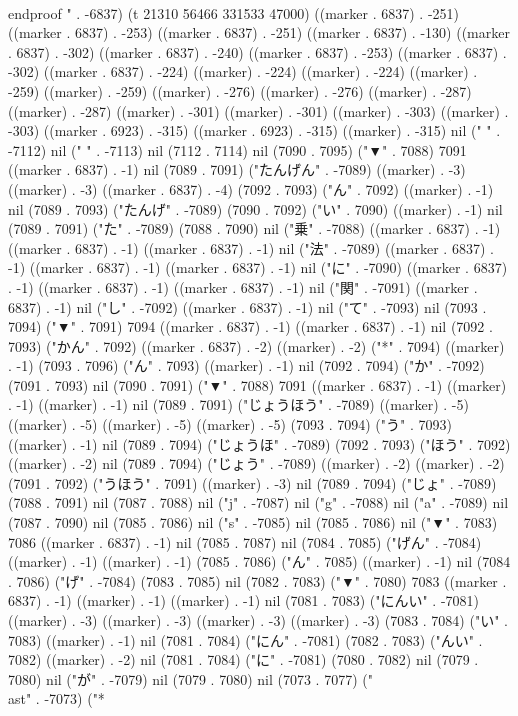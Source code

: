 \\end{proof}
" . -6837) (t 21310 56466 331533 47000) ((marker . 6837) . -251) ((marker . 6837) . -253) ((marker . 6837) . -251) ((marker . 6837) . -130) ((marker . 6837) . -302) ((marker . 6837) . -240) ((marker . 6837) . -253) ((marker . 6837) . -302) ((marker . 6837) . -224) ((marker) . -224) ((marker) . -224) ((marker) . -259) ((marker) . -259) ((marker) . -276) ((marker) . -276) ((marker) . -287) ((marker) . -287) ((marker) . -301) ((marker) . -301) ((marker) . -303) ((marker) . -303) ((marker . 6923) . -315) ((marker . 6923) . -315) ((marker) . -315) nil ("
" . -7112) nil (" " . -7113) nil (7112 . 7114) nil (7090 . 7095) ("▼" . 7088) 7091 ((marker . 6837) . -1) nil (7089 . 7091) ("たんげん" . -7089) ((marker) . -3) ((marker) . -3) ((marker . 6837) . -4) (7092 . 7093) ("ん" . 7092) ((marker) . -1) nil (7089 . 7093) ("たんげ" . -7089) (7090 . 7092) ("い" . 7090) ((marker) . -1) nil (7089 . 7091) ("た" . -7089) (7088 . 7090) nil ("乗" . -7088) ((marker . 6837) . -1) ((marker . 6837) . -1) ((marker . 6837) . -1) nil ("法" . -7089) ((marker . 6837) . -1) ((marker . 6837) . -1) ((marker . 6837) . -1) nil ("に" . -7090) ((marker . 6837) . -1) ((marker . 6837) . -1) ((marker . 6837) . -1) nil ("関" . -7091) ((marker . 6837) . -1) nil ("し" . -7092) ((marker . 6837) . -1) nil ("て" . -7093) nil (7093 . 7094) ("▼" . 7091) 7094 ((marker . 6837) . -1) ((marker . 6837) . -1) nil (7092 . 7093) ("かん" . 7092) ((marker . 6837) . -2) ((marker) . -2) ("*" . 7094) ((marker) . -1) (7093 . 7096) ("ん" . 7093) ((marker) . -1) nil (7092 . 7094) ("か" . -7092) (7091 . 7093) nil (7090 . 7091) ("▼" . 7088) 7091 ((marker . 6837) . -1) ((marker) . -1) ((marker) . -1) nil (7089 . 7091) ("じょうほう" . -7089) ((marker) . -5) ((marker) . -5) ((marker) . -5) ((marker) . -5) (7093 . 7094) ("う" . 7093) ((marker) . -1) nil (7089 . 7094) ("じょうほ" . -7089) (7092 . 7093) ("ほう" . 7092) ((marker) . -2) nil (7089 . 7094) ("じょう" . -7089) ((marker) . -2) ((marker) . -2) (7091 . 7092) ("うほう" . 7091) ((marker) . -3) nil (7089 . 7094) ("じょ" . -7089) (7088 . 7091) nil (7087 . 7088) nil ("j" . -7087) nil ("g" . -7088) nil ("a" . -7089) nil (7087 . 7090) nil (7085 . 7086) nil ("s" . -7085) nil (7085 . 7086) nil ("▼" . 7083) 7086 ((marker . 6837) . -1) nil (7085 . 7087) nil (7084 . 7085) ("げん" . -7084) ((marker) . -1) ((marker) . -1) (7085 . 7086) ("ん" . 7085) ((marker) . -1) nil (7084 . 7086) ("げ" . -7084) (7083 . 7085) nil (7082 . 7083) ("▼" . 7080) 7083 ((marker . 6837) . -1) ((marker) . -1) ((marker) . -1) nil (7081 . 7083) ("にんい" . -7081) ((marker) . -3) ((marker) . -3) ((marker) . -3) ((marker) . -3) (7083 . 7084) ("い" . 7083) ((marker) . -1) nil (7081 . 7084) ("にん" . -7081) (7082 . 7083) ("んい" . 7082) ((marker) . -2) nil (7081 . 7084) ("に" . -7081) (7080 . 7082) nil (7079 . 7080) nil ("が" . -7079) nil (7079 . 7080) nil (7073 . 7077) ("\\ast" . -7073) ("*
